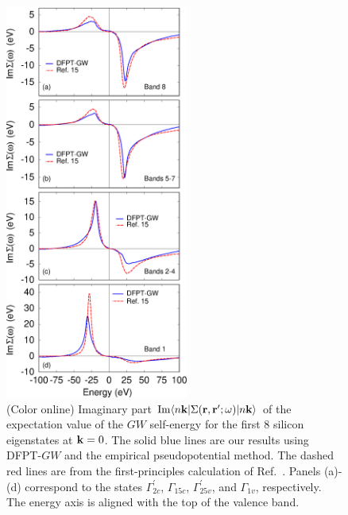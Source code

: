 \documentclass[twocolumn,prb,showpacs,superscriptaddress]{revtex4}
\def\w{\omega}
\def\k{{\bf k}}
\def\r{{\bf r}}
\def\rp{{\bf r^\prime}}
\begin{document}
\begin  {figure}
\begin  {center}
\includegraphics[width=6cm]{fig5.eps}
\end    {center}
\caption{\label{fig5}
        (Color online)
        Imaginary part ${\rm Im} \langle n\k| \Sigma(\r,\rp;\w)|n\k\rangle$ of the expectation value of the $GW$ self-energy for the first
        8 silicon eigenstates at $\k=0$. The solid blue lines are our results using DFPT-$GW$ and the empirical
        pseudopotential method. The dashed red lines are from the first-principles calculation of Ref.\ .
        Panels (a)-(d) correspond to the states $\Gamma^\prime_{2c}$, $\Gamma_{15c}$, $\Gamma^\prime_{25v}$, and $\Gamma_{1v}$, respectively.
        The energy axis is aligned with the top of the valence band.
        }
\end    {figure}
\end{document}
